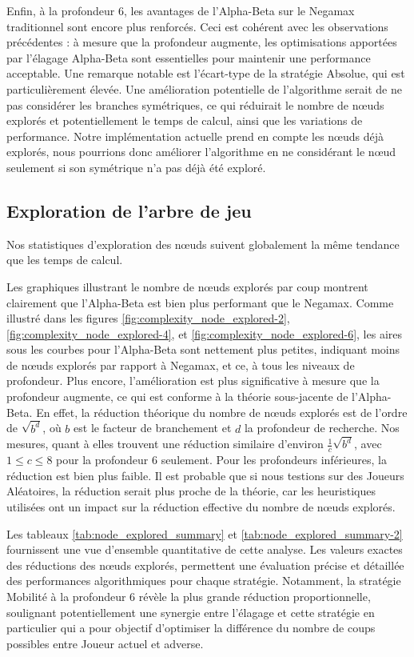 Enfin, à la profondeur 6, les avantages de l'Alpha-Beta sur le Negamax traditionnel sont encore plus renforcés. Ceci est cohérent avec les observations précédentes : à mesure que la profondeur augmente, les optimisations apportées par l'élagage Alpha-Beta sont essentielles pour maintenir une performance acceptable. Une remarque notable est l'écart-type de la stratégie Absolue, qui est particulièrement élevée. Une amélioration potentielle de l'algorithme serait de ne pas considérer les branches symétriques, ce qui réduirait le nombre de nœuds explorés et potentiellement le temps de calcul, ainsi que les variations de performance. Notre implémentation actuelle prend en compte les nœuds déjà explorés, nous pourrions donc améliorer l'algorithme en ne considérant le nœud seulement si son symétrique n'a pas déjà été exploré.


\subsection{Exploration de l'arbre de jeu}
Nos statistiques d'exploration des nœuds suivent globalement la même tendance que les temps de calcul.

Les graphiques illustrant le nombre de nœuds explorés par coup montrent clairement que l'Alpha-Beta est bien plus performant que le Negamax. Comme illustré dans les figures \ref{fig:complexity_node_explored-2}, \ref{fig:complexity_node_explored-4}, et \ref{fig:complexity_node_explored-6}, les aires sous les courbes pour l'Alpha-Beta sont nettement plus petites, indiquant moins de nœuds explorés par rapport à Negamax, et ce, à tous les niveaux de profondeur. Plus encore, l'amélioration est plus significative à mesure que la profondeur augmente, ce qui est conforme à la théorie sous-jacente de l'Alpha-Beta. En effet, la réduction théorique du nombre de nœuds explorés est de l'ordre de $\sqrt{b^d}$, où $b$ est le facteur de branchement et $d$ la profondeur de recherche. Nos mesures, quant à elles trouvent une réduction similaire d'environ $\frac{1}{c}\sqrt{b^d}$, avec $1\leq c\leq8$ pour la profondeur 6 seulement. Pour les profondeurs inférieures, la réduction est bien plus faible. Il est probable que si nous testions sur des Joueurs Aléatoires, la réduction serait plus proche de la théorie, car les heuristiques utilisées ont un impact sur la réduction effective du nombre de nœuds explorés.

Les tableaux \ref{tab:node_explored_summary} et \ref{tab:node_explored_summary-2} fournissent une vue d'ensemble quantitative de cette analyse. Les valeurs exactes des réductions des nœuds explorés, permettent une évaluation précise et détaillée des performances algorithmiques pour chaque stratégie. Notamment, la stratégie Mobilité à la profondeur 6 révèle la plus grande réduction proportionnelle, soulignant potentiellement une synergie entre l'élagage et cette stratégie en particulier qui a pour objectif d'optimiser la différence du nombre de coups possibles entre Joueur actuel et adverse.

